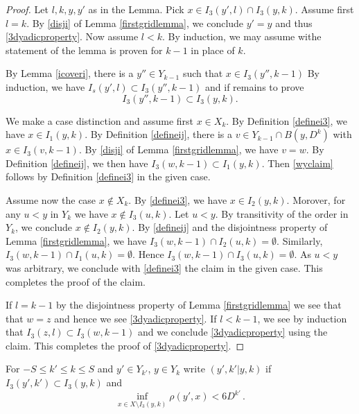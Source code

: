 \begin{proof}
Let $l,k,y,y'$ as in the Lemma.
Pick $x\in I_3(y',l)\cap I_3(y,k)$.
Assume first $l=k$. By \eqref{disji} of Lemma
\ref{firstgridlemma}, we conclude $y'=y$
and thus \eqref{3dyadicproperty}.
Now assume $l<k$. By induction, we may assume
    withe statement of the lemma is proven for $k-1$ in place of $k$.

By Lemma \ref{icoveri}, there is
a $y''\in Y_{k-1}$ such that $x\in I_3(y'',k-1)$
By induction, we have $I_s(y',l)\subset I_3(y'',k-1)$
and if remains to prove
\begin{equation}\label{wyclaim}
I_3(y'',k-1)\subset I_3(y,k).
\end{equation}

We make a case distinction and assume first $x\in X_k$.
By Definition \eqref{definei3}, we have
    $x\in I_1(y,k)$. By Definition \eqref{defineij}, there is a $v\in Y_{k-1}\cap B(y,D^k)$ with $x\in I_3(v,k-1)$.
By \eqref{disji} of Lemma \ref{firstgridlemma}, we have $v=w$.
By Definition \eqref{defineij}, we then have
$I_3(w,k-1)\subset I_1(y,k)$.
Then \eqref{wyclaim} follows by Definition \eqref{definei3} in the given case.

Assume now the case $x\notin X_k$.
By \eqref{definei3}, we have
    $x\in I_2(y,k)$. Morover, for any $u<y$ in
    $Y_k$ we have $x\not\in I_3(u,k)$.
    Let $u<y$. By transitivity of the order in $Y_k$, we conclude $x\not \in I_2(y,k)$.
By \eqref{defineij} and the disjointness property of Lemma \ref{firstgridlemma}, we have
$I_3(w,k-1)\cap  I_2(u,k)= \emptyset$.
Similarly, $I_3(w,k-1)\cap  I_1(u,k)= \emptyset$.
Hence $I_3(w,k-1)\cap  I_3(u,k)=\emptyset$.
As $u<y$ was arbitrary, we conclude with
\eqref{definei3} the claim in the given case.
This completes the proof of the claim.

If $l=k-1$ by the disjointness property
of Lemma \ref{firstgridlemma} we see that
that $w=z$ and hence we see \eqref{3dyadicproperty}.
If $l<k-1$, we see by induction that
$I_3(z,l)\subset I_3(w,k-1)$ and we conclude
\eqref{3dyadicproperty} using the claim.
This completes the proof of \eqref{3dyadicproperty}.
\end{proof}




For $-S\le k'\le k\le S$ and $y'\in Y_{k'}$, $y\in Y_k$
write  $(y',k'|y,k)$ if $I_3(y',k')\subset I_3(y,k)$ and
\begin{equation}\label{bdcond}
    \inf_{x\in X\setminus I_3(y,k)}\rho(y',x)<6D^{k'}\, .
\end{equation}


